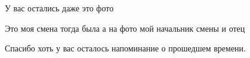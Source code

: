  
 
 
 
 
У вас остались даже это фото

Это моя смена тогда была а на фото мой начальник смены и отец

Спасибо хоть у вас осталось напоминание о прошедшем времени.
